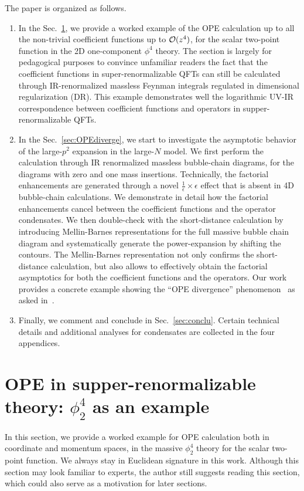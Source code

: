 \documentclass[a4paper,11pt]{article}
\begin{document}
The paper is organized as follows. \begin{enumerate}
    \item In the Sec.~\ref{sec:OPEintro}, we provide a worked example of the OPE calculation up to all the non-trivial coefficient functions up to ${\cal O}(z^4)$, for the scalar two-point function in the 2D one-component $\phi^4$ theory. The section is largely for pedagogical purposes to convince unfamiliar readers the fact that the coefficient functions in super-renormalizable QFTs can still be calculated through IR-renormalized massless Feynman integrals regulated in dimensional regularization (DR). This example demonstrates well the logarithmic UV-IR correspondence between coefficient functions and operators in supper-renormalizable QFTs.
    \item In the Sec.~\ref{sec:OPEdiverge}, we start to investigate the asymptotic behavior of the large-$p^2$ expansion in the large-$N$ model. We first perform the calculation through IR renormalized massless bubble-chain diagrams, for the diagrams with zero and one mass insertions. Technically, the factorial enhancements are generated through a novel $\frac{1}{\epsilon} \times \epsilon$ effect that is absent in 4D bubble-chain calculations. We demonstrate in detail how the factorial enhancements cancel between the coefficient functions and the operator condensates. We then double-check with the short-distance calculation by introducing Mellin-Barnes representations for the full massive bubble chain diagram and systematically generate the power-expansion by shifting the contours. The Mellin-Barnes representation not only confirms the short-distance calculation, but also allows to effectively obtain the factorial asymptotics for both the coefficient functions and the operators. Our work  provides a concrete example showing the ``OPE divergence'' phenomenon~\cite{Shifman:1994yf} as asked in~\cite{Marino:2023epd}.
    \item Finally, we comment and conclude in Sec.~\ref{sec:conclu}. Certain technical details and additional analyses for condensates are collected in the four appendices. 

    
\end{enumerate}





\section{OPE in supper-renormalizable theory: $\phi^4_2$ as an example }\label{sec:OPEintro}
In this section, we provide a worked example for OPE calculation both in coordinate and momentum spaces, in the massive $\phi^4_2$ theory for the scalar two-point function. We always stay in Euclidean signature in this work. Although this section may look familiar to experts, the author still suggests reading this section, which could also serve as a motivation for later sections. 
\end{document}
